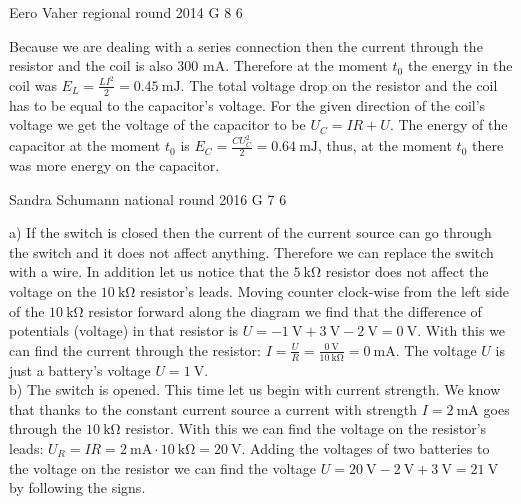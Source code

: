 \documentclass[11pt]{article}
\begin{document}
{Eero Vaher} %
{regional round} %
{2014} %
{G 8} %
{6} %
{

\ifEngSolution
Because we are dealing with a series connection then the current through the resistor and the coil is also 300 mA. Therefore at the moment $t_0$ the energy in the coil was $E_L=\frac{LI^2}{2}=\SI{0.45}{\milli\joule}$. The total voltage drop on the resistor and the coil has to be equal to the capacitor’s voltage. For the given direction of the coil’s voltage we get the voltage of the capacitor to be $U_C=IR+U$. The energy of the capacitor at the moment $t_0$ is $E_C=\frac{CU_C^2}{2}=\SI{0.64}{\milli\joule}$, thus, at the moment $t_0$ there was more energy on the capacitor.
\fi
}

{Sandra Schumann} %
{national round} %
{2016} %
{G 7} %
{6} %
{

\ifEngSolution
a) If the switch is closed then the current of the current source can go through the switch and it does not affect anything. Therefore we can replace the switch with a wire. In addition let us notice that the $\SI{5}{\kilo\ohm}$ resistor does not affect the voltage on the $\SI{10}{\kilo\ohm}$ resistor’s leads.  Moving counter clock-wise from the left side of the $\SI{10}{\kilo\ohm}$ resistor forward along the diagram we find that the difference of potentials (voltage) in that resistor is $U = -\SI{1}{\volt} + \SI{3}{\volt} - \SI{2}{\volt} = \SI{0}{\volt}$. With this we can find the current through the resistor: $I = \frac U R = \frac {\SI{0}{\volt}} {\SI{10}{\kilo\ohm}} = \SI{0}{\milli\ampere}$. The voltage $U$ is just a battery’s voltage $U=\SI{1}{\volt}$.\\
b) The switch is opened. This time let us begin with current strength. We know that thanks to the constant current source a current with strength $I = \SI{2}{\milli\ampere}$ goes through the $\SI{10}{\kilo\ohm}$ resistor. With this we can find the voltage on the resistor’s leads: $U_R = IR = \SI{2}{\milli\ampere} \cdot \SI{10}{\kilo\ohm} = \SI{20}{\volt}$. Adding the voltages of two batteries to the voltage on the resistor we can find the voltage $U = \SI{20}{\volt} - \SI{2}{\volt} + \SI{3}{\volt} = \SI{21}{\volt}$ by following the signs.
\fi
}
\end{document}
